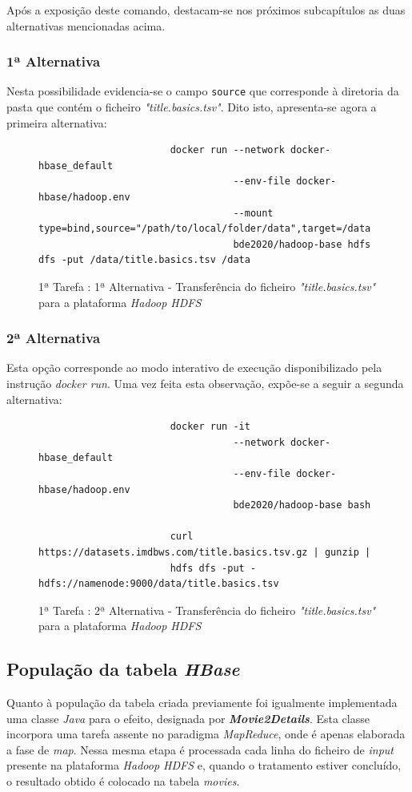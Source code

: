 \documentclass[a4paper]{report}
\begin{document}
{		Após a exposição deste comando, destacam-se nos próximos subcapítulos as duas alternativas mencionadas acima.

			\subsubsection{1ª Alternativa}
			Nesta possibilidade evidencia-se o campo \texttt{source} que corresponde à diretoria da pasta que contém o ficheiro \textit{"title.basics.tsv"}.
			Dito isto, apresenta-se agora a primeira alternativa:
			\begin{figure}[H]
				{
					\color{teal}
					\begin{verbatim}
					   docker run --network docker-hbase_default
					              --env-file docker-hbase/hadoop.env
					              --mount type=bind,source="/path/to/local/folder/data",target=/data
					              bde2020/hadoop-base hdfs dfs -put /data/title.basics.tsv /data
					\end{verbatim}
				}
				\caption{1ª Tarefa : 1ª Alternativa - Transferência do ficheiro \textit{"title.basics.tsv"} para a plataforma \textit{Hadoop HDFS}}
				\label{fig:10}
			\end{figure}

			\subsubsection{2ª Alternativa}
			Esta opção corresponde ao modo interativo de execução disponibilizado pela instrução \textit{docker run}.
			Uma vez feita esta observação, expõe-se a seguir a segunda alternativa:
			\begin{figure}[H]
				{
					\color{teal}
					\begin{verbatim}
					   docker run -it
					              --network docker-hbase_default
					              --env-file docker-hbase/hadoop.env
					              bde2020/hadoop-base bash

					   curl https://datasets.imdbws.com/title.basics.tsv.gz | gunzip |
					   hdfs dfs -put - hdfs://namenode:9000/data/title.basics.tsv
					\end{verbatim}
				}
				\caption{1ª Tarefa : 2ª Alternativa - Transferência do ficheiro \textit{"title.basics.tsv"} para a plataforma \textit{Hadoop HDFS}}
				\label{fig:11}
			\end{figure}

		\subsection{População da tabela \textit{HBase}} \label{subsec:Task1-3}
		Quanto à população da tabela criada previamente foi igualmente implementada uma classe \textit{Java} para o efeito, designada por \textbf{\textit{Movie2Details}}.
		Esta classe incorpora uma tarefa assente no paradigma \textit{MapReduce}, onde é apenas elaborada a fase de \textit{map}.
		Nessa mesma etapa é processada cada linha do ficheiro de \textit{input} presente na plataforma \textit{Hadoop HDFS} e, quando o tratamento estiver concluído, o resultado obtido é colocado na tabela \textit{movies}.
		
}
\end{document}
